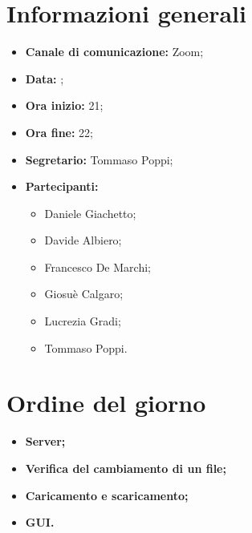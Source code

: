 \section{Informazioni generali}

\begin{itemize}

	\item \textbf{Canale di comunicazione:} Zoom;
	
	\item \textbf{Data:} \DataMeeting{};
	
	\item \textbf{Ora inizio:} 21;
	
	\item \textbf{Ora fine:} 22;
	
	\item \textbf{Segretario:} Tommaso Poppi;
	
	\item \textbf{Partecipanti:}
	
		\begin{itemize}

			\item Daniele Giachetto;
			\item Davide Albiero;
			\item Francesco De Marchi;
			\item Giosuè Calgaro;
			\item Lucrezia Gradi;
			\item Tommaso Poppi.

		\end{itemize}

\end{itemize}



\section{Ordine del giorno}

\begin{itemize}

	\item\textbf{Server;}
	
	\item\textbf{Verifica del cambiamento di un file;}
	
	\item\textbf{Caricamento e scaricamento;}
	
	\item\textbf{GUI.}

\end{itemize}

